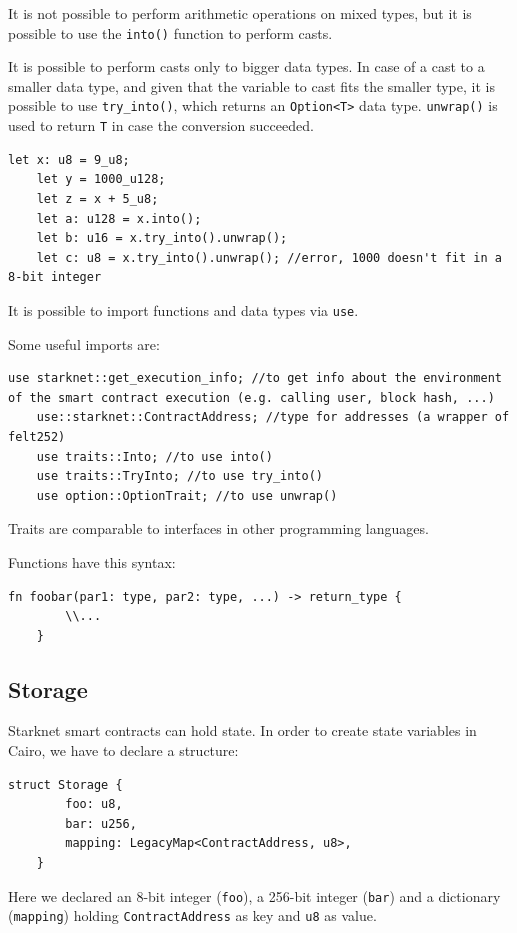 \documentclass[12pt]{article}
\begin{document}
It is not possible to perform arithmetic operations on mixed types, but it is possible to use the \verb|into()| function to perform casts.

It is possible to perform casts only to bigger data types. In case of a cast to a smaller data type, and given that the variable to cast fits the smaller type, it is possible to use \verb|try_into()|, which returns an \verb|Option<T>| data type. \verb|unwrap()| is used to return \verb|T| in case the conversion succeeded.
\begin{lstlisting}[language=cairo]
    let x: u8 = 9_u8;
    let y = 1000_u128;
    let z = x + 5_u8;
    let a: u128 = x.into();
    let b: u16 = x.try_into().unwrap();
    let c: u8 = x.try_into().unwrap(); //error, 1000 doesn't fit in a 8-bit integer
\end{lstlisting}

It is possible to import functions and data types via \verb|use|.

Some useful imports are:
\begin{lstlisting}[language=cairo]
    use starknet::get_execution_info; //to get info about the environment of the smart contract execution (e.g. calling user, block hash, ...)
    use::starknet::ContractAddress; //type for addresses (a wrapper of felt252)
    use traits::Into; //to use into()
    use traits::TryInto; //to use try_into()
    use option::OptionTrait; //to use unwrap()
\end{lstlisting}

Traits are comparable to interfaces in other programming languages.

Functions have this syntax:
\begin{lstlisting}[language=cairo]
    fn foobar(par1: type, par2: type, ...) -> return_type {
        \\...
    }
\end{lstlisting}

\subsection{Storage} \label{subsection:storage}
Starknet smart contracts can hold state. In order to create state variables in Cairo, we have to declare a structure:
\begin{lstlisting}[language=cairo]
    struct Storage {
        foo: u8,
        bar: u256,
        mapping: LegacyMap<ContractAddress, u8>,
    }
\end{lstlisting}

Here we declared an 8-bit integer (\verb|foo|), a 256-bit integer (\verb|bar|) and a dictionary (\verb|mapping|) holding \verb|ContractAddress| as key and \verb|u8| as value.
\end{document}
